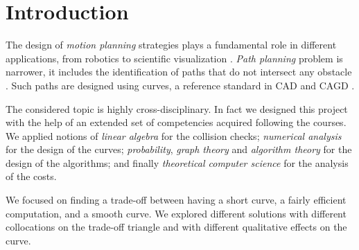 \documentclass[dissertation.tex]{subfiles}
\begin{document}
\chapter{Introduction}
The design of \emph{motion planning} strategies plays a fundamental
role in different applications, from robotics to scientific
visualization \cite{giannelli}. \emph{Path planning} problem is
narrower, it includes the identification of paths that do not
intersect any obstacle \cite{giannelli}. Such paths are designed using
\bs curves, a reference standard in \ac{CAD} and \ac{CAGD}
\cite{hughes}\cite{foley}.

The considered topic is highly cross-disciplinary. In fact we designed
this project with the help of an extended set of
competencies acquired following the courses. We applied notions of
\emph{linear algebra} for the collision checks; \emph{numerical
  analysis} for the design of the curves; \emph{probability},
\emph{graph theory} and \emph{algorithm theory} for the design of the
algorithms; and finally \emph{theoretical computer science} for the
analysis of the costs.

We focused on finding a trade-off between having a short curve, a
fairly efficient computation, and a smooth curve. We explored
different solutions with different collocations on the trade-off
triangle and with different qualitative effects on the curve.
\end{document}
